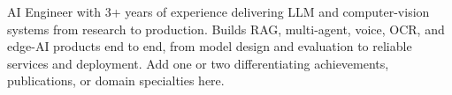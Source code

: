 AI Engineer with 3+ years of experience delivering LLM and computer-vision systems from research to production. Builds RAG, multi-agent, voice, OCR, and edge-AI products end to end, from model design and evaluation to reliable services and deployment. Add one or two differentiating achievements, publications, or domain specialties here.
\par
